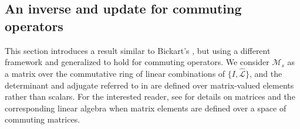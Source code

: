 \documentclass[a4paper,10pt]{article}
\begin{document}
\subsection{An inverse and update for commuting operators}\label{sec:solve:inv}

This section introduces a result similar to Bickart's \cite{bickart77},
but using a different framework and generalized to hold for commuting
operators. We consider $\mathcal{M}_s$ as a matrix over the commutative
ring of linear combinations of $\{I, \widehat{\mathcal{L}}\}$,
and the determinant and adjugate referred to in  are defined
over matrix-valued elements rather than scalars. For the interested reader,
see \cite{brown1993matrices} for details on matrices and the corresponding
linear algebra when matrix elements are defined over a space of commuting
matrices.
\end{document}
